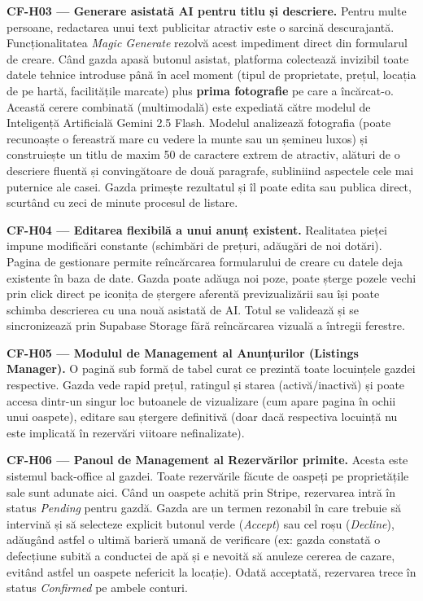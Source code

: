 \documentclass[12pt,a4paper,oneside]{report}
\begin{document}
\textbf{CF-H03 — Generare asistată AI pentru titlu și descriere.} Pentru multe persoane, redactarea unui text publicitar atractiv este o sarcină descurajantă. Funcționalitatea \textit{Magic Generate} rezolvă acest impediment direct din formularul de creare. Când gazda apasă butonul asistat, platforma colectează invizibil toate datele tehnice introduse până în acel moment (tipul de proprietate, prețul, locația de pe hartă, facilitățile marcate) plus \textbf{prima fotografie} pe care a încărcat-o. Această cerere combinată (multimodală) este expediată către modelul de Inteligență Artificială Gemini 2.5 Flash. Modelul analizează fotografia (poate recunoaște o fereastră mare cu vedere la munte sau un șemineu luxos) și construiește un titlu de maxim 50 de caractere extrem de atractiv, alături de o descriere fluentă și convingătoare de două paragrafe, subliniind aspectele cele mai puternice ale casei. Gazda primește rezultatul și îl poate edita sau publica direct, scurtând cu zeci de minute procesul de listare.

\textbf{CF-H04 — Editarea flexibilă a unui anunț existent.} Realitatea pieței impune modificări constante (schimbări de prețuri, adăugări de noi dotări). Pagina de gestionare permite reîncărcarea formularului de creare cu datele deja existente în baza de date. Gazda poate adăuga noi poze, poate șterge pozele vechi prin click direct pe iconița de ștergere aferentă previzualizării sau își poate schimba descrierea cu una nouă asistată de AI. Totul se validează și se sincronizează prin Supabase Storage fără reîncărcarea vizuală a întregii ferestre.

\textbf{CF-H05 — Modulul de Management al Anunțurilor (Listings Manager).} O pagină sub formă de tabel curat ce prezintă toate locuințele gazdei respective. Gazda vede rapid prețul, ratingul și starea (activă/inactivă) și poate accesa dintr-un singur loc butoanele de vizualizare (cum apare pagina în ochii unui oaspete), editare sau ștergere definitivă (doar dacă respectiva locuință nu este implicată în rezervări viitoare nefinalizate).

\textbf{CF-H06 — Panoul de Management al Rezervărilor primite.} Acesta este sistemul back-office al gazdei. Toate rezervările făcute de oaspeți pe proprietățile sale sunt adunate aici. Când un oaspete achită prin Stripe, rezervarea intră în status \textit{Pending} pentru gazdă. Gazda are un termen rezonabil în care trebuie să intervină și să selecteze explicit butonul verde (\textit{Accept}) sau cel roșu (\textit{Decline}), adăugând astfel o ultimă barieră umană de verificare (ex: gazda constată o defecțiune subită a conductei de apă și e nevoită să anuleze cererea de cazare, evitând astfel un oaspete nefericit la locație). Odată acceptată, rezervarea trece în status \textit{Confirmed} pe ambele conturi.
\end{document}
